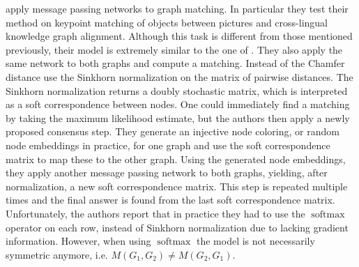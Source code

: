 \cite{fey2020_update} apply message passing networks to graph matching. In particular they test their method on keypoint matching of objects between pictures and cross-lingual knowledge graph alignment. Although this task is different from those mentioned previously, their model is extremely similar to the one of \cite{riba2018}. They also apply the same network to both graphs and compute a matching. Instead of the Chamfer distance \cite{fey2020_update} use the Sinkhorn normalization \cite{sinkhorn2013} on the matrix of pairwise distances. The Sinkhorn normalization returns a doubly stochastic matrix, which is interpreted as a soft correspondence between nodes. One could immediately find a matching by taking the maximum likelihood estimate, but the authors then apply a newly proposed consensus step. They generate an injective node coloring, or random node embeddings in practice, for one graph and use the soft correspondence matrix to map these to the other graph. Using the generated node embeddings, they apply another message passing network to both graphs, yielding, after normalization, a new soft correspondence matrix. This step is repeated multiple times and the final answer is found from the last soft correspondence matrix. Unfortunately, the authors report that in practice they had to use the $\operatorname{softmax}$ operator on each row, instead of Sinkhorn normalization due to lacking gradient information. However, when using $\operatorname{softmax}$ the model is not necessarily symmetric anymore, i.e. $M(G_1, G_2) \neq M(G_2, G_1)$.







